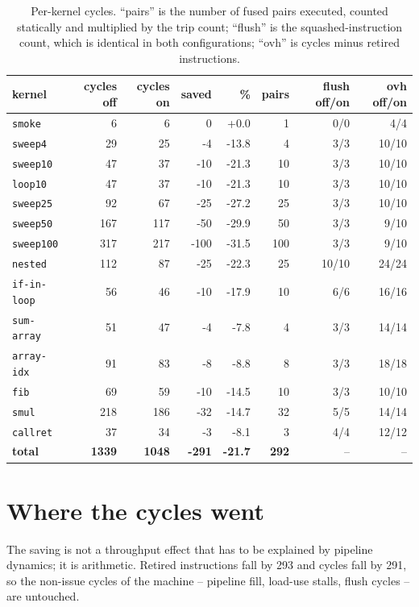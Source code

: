 \documentclass[11pt]{article}
\begin{document}
\begin{table}[h]
\centering\small
\caption{Per-kernel cycles. ``pairs'' is the number of fused pairs executed, counted
statically and multiplied by the trip count; ``flush'' is the squashed-instruction count,
which is identical in both configurations; ``ovh'' is cycles minus retired instructions.}
\begin{tabular}{lrrrrrrr}
\toprule
kernel & cycles off & cycles on & saved & \% & pairs & flush off/on & ovh off/on \\
\midrule
\texttt{smoke} & 6 & 6 & 0 & +0.0 & 1 & 0/0 & 4/4 \\
\texttt{sweep4} & 29 & 25 & -4 & -13.8 & 4 & 3/3 & 10/10 \\
\texttt{sweep10} & 47 & 37 & -10 & -21.3 & 10 & 3/3 & 10/10 \\
\texttt{loop10} & 47 & 37 & -10 & -21.3 & 10 & 3/3 & 10/10 \\
\texttt{sweep25} & 92 & 67 & -25 & -27.2 & 25 & 3/3 & 10/10 \\
\texttt{sweep50} & 167 & 117 & -50 & -29.9 & 50 & 3/3 & 9/10 \\
\texttt{sweep100} & 317 & 217 & -100 & -31.5 & 100 & 3/3 & 9/10 \\
\texttt{nested} & 112 & 87 & -25 & -22.3 & 25 & 10/10 & 24/24 \\
\texttt{if-in-loop} & 56 & 46 & -10 & -17.9 & 10 & 6/6 & 16/16 \\
\texttt{sum-array} & 51 & 47 & -4 & -7.8 & 4 & 3/3 & 14/14 \\
\texttt{array-idx} & 91 & 83 & -8 & -8.8 & 8 & 3/3 & 18/18 \\
\texttt{fib} & 69 & 59 & -10 & -14.5 & 10 & 3/3 & 10/10 \\
\texttt{smul} & 218 & 186 & -32 & -14.7 & 32 & 5/5 & 14/14 \\
\texttt{callret} & 37 & 34 & -3 & -8.1 & 3 & 4/4 & 12/12 \\
\hline
\textbf{total} & \textbf{1339} & \textbf{1048} & \textbf{-291} & \textbf{-21.7} & \textbf{292} & -- & -- \\
\bottomrule
\end{tabular}
\end{table}

\section{Where the cycles went}

The saving is not a throughput effect that has to be explained by pipeline dynamics; it is
arithmetic. Retired instructions fall by 293 and cycles fall by 291, so the non-issue cycles
of the machine -- pipeline fill, load-use stalls, flush cycles -- are untouched.
\end{document}
